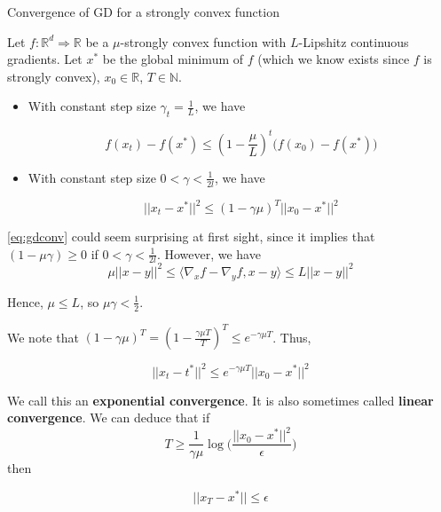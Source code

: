\documentclass[
10pt, %
a4paper, %
oneside, %
headinclude,footinclude, %
BCOR5mm, %
]{scrartcl}
\begin{document}
\begin{theorem}{Convergence of GD for a strongly convex function}

    Let $f: \mathbb{R}^d\Rightarrow \mathbb{R}	$ be a  $\mu$-strongly convex function with $L$-Lipshitz continuous gradients. Let $x^*$ be the global minimum of $f$ (which we know exists since $f$ is strongly convex), $x_0\in \mathbb{R} $, $T\in \mathbb{N}$.

    \begin{itemize}
	\item With constant step size $\gamma_t = \frac{1}{L} $, we have

	    \begin{equation*}
		f(x_t)-f(x^*)\leq ( 1- \frac{\mu}{L})^t\big(f(x_0)-f(x^*)\big) 
	    \end{equation*}
        \item With constant step size $0<\gamma < \frac{1}{2l} $, we have

    \begin{equation}
	\label{eq:gdconv}
	||x_t-x^*||^2\leq (1-\gamma \mu)^T ||x_0-x^*||^2
    \end{equation}
    \end{itemize}
\end{theorem}

\begin{remark}
    \ref{eq:gdconv} could seem surprising at first sight, since it implies that $ (1-\mu\gamma)\geq 0$ if $0<\gamma< \frac{1}{2l}$. However, we have
\begin{equation*}
    \mu ||x-y||^2\leq \langle \nabla_xf-\nabla_yf, x-y \rangle \leq L||x-y||^2
\end{equation*}

Hence, $\mu\leq L$, so $\mu\gamma < \frac{1}{2} $.
\end{remark}

\begin{corollary}
    We note that $ (1-\gamma \mu)^T = (1- \frac{ \gamma \mu T}{T} )^T\leq e^{-\gamma \mu T}$. Thus,

    \begin{equation*}
	||x_t-t^*||^2\leq e^{-\gamma\mu T}||x_0-x^*||^2
    \end{equation*}

    We call this an \textbf{{exponential convergence}}. It is also sometimes called \textbf{{linear convergence}}. We can deduce that if 
    \begin{equation*}
	T \geq \frac{1}{ \gamma \mu} \log \big( \frac{||x_0-x^*||^2}{\epsilon}  \big)
    \end{equation*}
    then

    \begin{equation*}
        ||x_T-x^*||\leq \epsilon
    \end{equation*}
\end{corollary}
\end{document}
